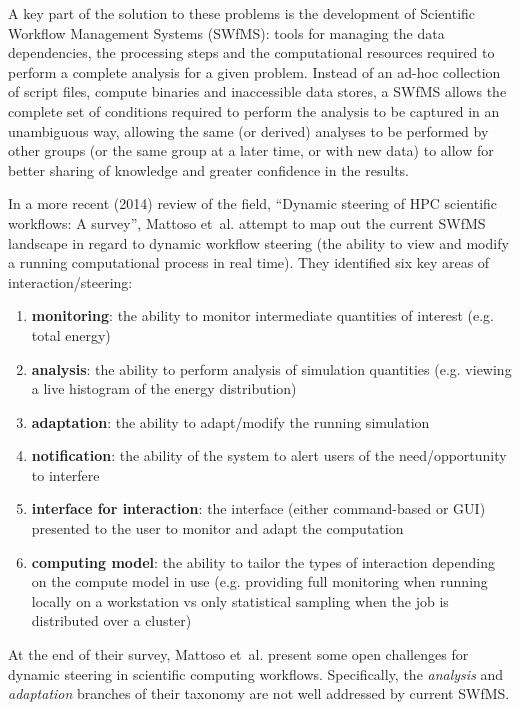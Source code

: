 \documentclass[a4paper]{scrartcl}
\begin{document}
A key part of the solution to these problems is the development of
Scientific Workflow Management Systems\parencite{Deelman} (SWfMS):
tools for managing the data dependencies, the processing steps and the
computational resources required to perform a complete analysis for a
given problem. Instead of an ad-hoc collection of script files,
compute binaries and inaccessible data stores, a SWfMS allows the
complete set of conditions required to perform the analysis to be
captured in an unambiguous way, allowing the same (or derived)
analyses to be performed by other groups (or the same group at a later
time, or with new data) to allow for better sharing of knowledge and
greater confidence in the results.

In a more recent (2014) review of the field, ``Dynamic steering of HPC
scientific workflows: A survey''\parencite{Mattoso}, Mattoso et~al.
attempt to map out the current SWfMS landscape in regard to dynamic
workflow steering (the ability to view and modify a running
computational process in real time). They identified six key areas of
interaction/steering:
\begin{enumerate}
\item \textbf{monitoring}: the ability to monitor intermediate
  quantities of interest (e.g. total energy)
\item \textbf{analysis}: the ability to perform analysis of simulation
  quantities (e.g. viewing a live histogram of the energy
  distribution)
\item \textbf{adaptation}: the ability to adapt/modify the running
  simulation
\item \textbf{notification}: the ability of the system to alert users of the
  need/opportunity to interfere
\item \textbf{interface for interaction}: the interface (either command-based
  or GUI) presented to the user to monitor and adapt the computation
\item \textbf{computing model}: the ability to tailor the types of interaction
  depending on the compute model in use (e.g. providing full
  monitoring when running locally on a workstation vs only statistical
  sampling when the job is distributed over a cluster)
\end{enumerate}
At the end of their survey, Mattoso et~al. present some open
challenges for dynamic steering in scientific computing workflows.
Specifically, the \emph{analysis} and \emph{adaptation} branches of
their taxonomy are not well addressed by current SWfMS.
\end{document}
